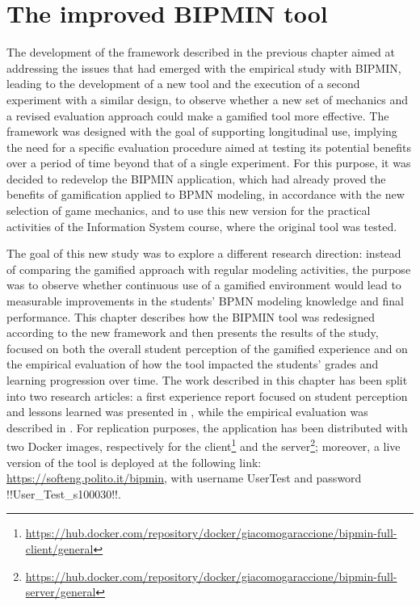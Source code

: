 \chapter{The improved BIPMIN tool}
\label{ch5}

The development of the framework described in the previous chapter aimed at addressing the issues that had emerged with the empirical study with BIPMIN, leading to the development of a new tool and the execution of a second experiment with a similar design, to observe whether a new set of mechanics and a revised evaluation approach could make a gamified tool more effective. The framework was designed with the goal of supporting longitudinal use, implying the need for a specific evaluation procedure aimed at testing its potential benefits over a period of time beyond that of a single experiment. For this purpose, it was decided to redevelop the BIPMIN application, which had already proved the benefits of gamification applied to BPMN modeling, in accordance with the new selection of game mechanics, and to use this new version for the practical activities of the Information System course, where the original tool was tested.

The goal of this new study was to explore a different research direction: instead of comparing the gamified approach with regular modeling activities, the purpose was to observe whether continuous use of a gamified environment would lead to measurable improvements in the students' BPMN modeling knowledge and final performance. This chapter describes how the BIPMIN tool was redesigned according to the new framework and then presents the results of the study, focused on both the overall student perception of the gamified experience and on the empirical evaluation of how the tool impacted the students' grades and learning progression over time. The work described in this chapter has been split into two research articles: a first experience report focused on student perception and lessons learned was presented in \cite{garaccione2024ease}, while the empirical evaluation was described in \cite{garaccione2024esem}. For replication purposes, the application has been distributed with two Docker images, respectively for the client\footnote{\url{https://hub.docker.com/repository/docker/giacomogaraccione/bipmin-full-client/general}} and the server\footnote{\url{https://hub.docker.com/repository/docker/giacomogaraccione/bipmin-full-server/general}}; moreover, a live version of the tool is deployed at the following link: \url{https://softeng.polito.it/bipmin}, with username UserTest and password !!User\_Test\_s100030!!.

